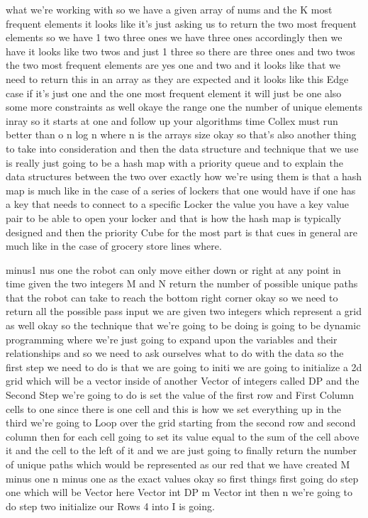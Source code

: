 \expandafter\def\csname sourceexcerpt@62\endcsname{%
what we're working with so we have a given array of nums and the K most frequent
elements it looks like it's just asking us to return the two most frequent elements so
we have 1 two three ones we have three ones accordingly then we have it looks like two
twos and just 1 three so there are three ones and two twos the two most frequent
elements are yes one and two and it looks like that we need to return this in an array
as they are expected and it looks like this Edge case if it's just one and the one
most frequent element it will just be one also some more constraints as well okaye the
range one the number of unique elements inray so it starts at one and follow up your
algorithms time Collex must run better than o n log n where n is the arrays size okay
so that's also another thing to take into consideration and then the data structure
and technique that we use is really just going to be a hash
map with a priority queue and to explain the data structures between the two over exactly
how we're using them is that a hash map is much like in the case of a series of
lockers that one would have if one has a key that needs to connect to a specific
Locker the value you have a key value pair to be able to open your locker and that is
how the hash map is typically designed and then the priority Cube for the most part is
that cues in general are much like in the case of grocery store lines where.
}

\expandafter\def\csname sourceexcerpt@63\endcsname{%
minus1 nus one the robot can only move either down or right at any point in time given
the two integers M and N return the number of possible unique paths that the robot can
take to reach the bottom right corner okay so we need to return all the possible pass
input we are given two integers which represent a grid as well okay so the technique
that we're going to be doing is going to be dynamic programming where we're just going
to expand upon the variables and their relationships and so we need to ask ourselves
what to do with the data so the first step we need to do is that we are going to initi
we are going to initialize a 2d grid which will be a vector inside of another Vector
of integers called DP and the Second Step we're going to do is set the value of the
first row and First Column cells to one since there is one cell and this is how we set
everything up in the third we're going to Loop over the grid starting from the second
row and second column then for each cell going to set its value equal to the sum of
the cell above it and the cell to the left of it and we are just going to finally
return the number of unique paths which would be represented as our red that we have
created M minus one n minus one as the exact values okay so first things first going
do step one which will be Vector here Vector int DP m Vector int then n we're going to
do step two initialize our Rows 4 into I is going.
}

